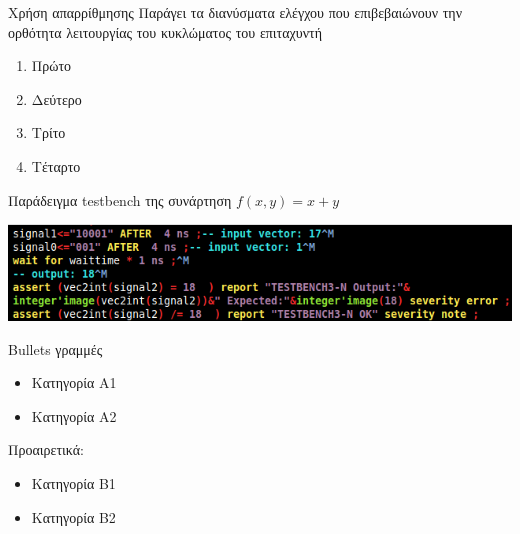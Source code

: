 \documentclass[12pt,t,aspectratio=169,xcolor=table]{beamer}
\begin{document}
\begin{frame}{Χρήση απαρρίθμησης}
	Παράγει τα διανύσματα ελέγχου που επιβεβαιώνουν την ορθότητα λειτουργίας του κυκλώματος του επιταχυντή
	
	\begin{enumerate}
	\item Πρώτο
	\item Δεύτερο
	\item Τρίτο
	\item Τέταρτο
	\end{enumerate}

\bigskip
Παράδειγμα testbench της συνάρτηση $f(x,y)=x+y$

	\includegraphics[scale=0.6]{tb}

\end{frame}

\begin{frame}{Bullets γραμμές}
	\begin{itemize}
	\item Κατηγορία Α1
	\item Κατηγορία Α2
	\end{itemize}

\bigskip

Προαιρετικά:
	\begin{itemize}
		\item Κατηγορία Β1
		\item Κατηγορία Β2
	\end{itemize}
\end{frame}
\end{document}
